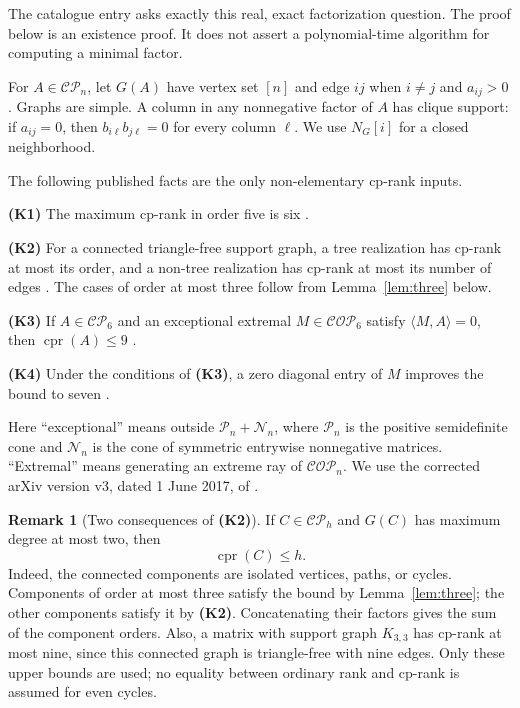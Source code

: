 \documentclass[11pt,a4paper]{article}
\theoremstyle{definition}
\newtheorem{remark}[theorem]{Remark}
\newcommand{\CP}{\mathcal{CP}}
\newcommand{\COP}{\mathcal{COP}}
\newcommand{\PSD}{\mathcal{P}}
\newcommand{\NN}{\mathcal{N}}
\DeclareMathOperator{\cpr}{cpr}
\newcommand{\ip}[2]{\langle #1,#2\rangle}
\newcommand{\inputfact}[1]{\textbf{(#1)}}
\begin{document}
The catalogue entry \cite{catalogue} asks exactly this real, exact factorization question. The proof below is an existence proof. It does not assert a polynomial-time algorithm for computing a minimal factor.

For $A\in\CP_n$, let $G(A)$ have vertex set $[n]$ and edge $ij$ when $i\ne j$ and $a_{ij}>0$. Graphs are simple. A column in any nonnegative factor of $A$ has clique support: if $a_{ij}=0$, then $b_{i\ell}b_{j\ell}=0$ for every column $\ell$. We use $N_G[i]$ for a closed neighborhood.

The following published facts are the only non-elementary cp-rank inputs.

\noindent\inputfact{K1} The maximum cp-rank in order five is six \cite{orderfive}.

\noindent\inputfact{K2} For a connected triangle-free support graph, a tree realization has cp-rank at most its order, and a non-tree realization has cp-rank at most its number of edges \cite[Proposition 2.4]{graphbounds}. The cases of order at most three follow from Lemma~\ref{lem:three} below.

\noindent\inputfact{K3} If $A\in\CP_6$ and an exceptional extremal $M\in\COP_6$ satisfy $\ip{M}{A}=0$, then $\cpr(A)\leq9$ \cite[Theorem 1.1]{djl6}.

\noindent\inputfact{K4} Under the conditions of \inputfact{K3}, a zero diagonal entry of $M$ improves the bound to seven \cite[Lemma 3.1]{djl6}.

Here ``exceptional'' means outside $\PSD_n+\NN_n$, where $\PSD_n$ is the positive semidefinite cone and $\NN_n$ is the cone of symmetric entrywise nonnegative matrices. ``Extremal'' means generating an extreme ray of $\COP_n$. We use the corrected arXiv version v3, dated 1 June 2017, of \cite{djl6}.

\begin{remark}[Two consequences of \inputfact{K2}]\label{rem:cyclebound}
If $C\in\CP_h$ and $G(C)$ has maximum degree at most two, then
\begin{equation}\label{eq:degree-two}
 \cpr(C)\leq h.
\end{equation}
Indeed, the connected components are isolated vertices, paths, or cycles. Components of order at most three satisfy the bound by Lemma~\ref{lem:three}; the other components satisfy it by \inputfact{K2}. Concatenating their factors gives the sum of the component orders. Also, a matrix with support graph $K_{3,3}$ has cp-rank at most nine, since this connected graph is triangle-free with nine edges. Only these upper bounds are used; no equality between ordinary rank and cp-rank is assumed for even cycles.
\end{remark}
\end{document}
